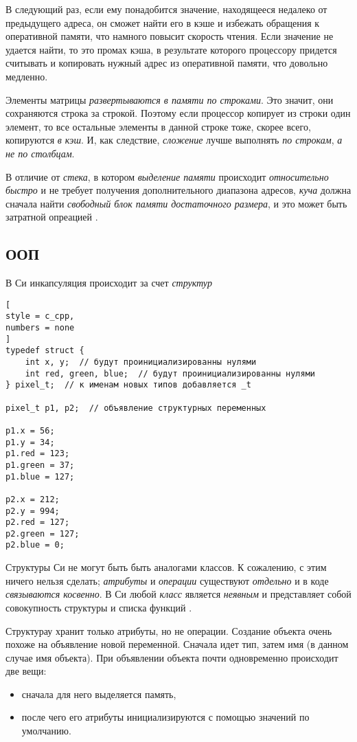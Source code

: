 \documentclass[%
	11pt,
	a4paper,
	utf8,
		]{article}
\begin{document}
В следующий раз, если ему понадобится значение, находящееся недалеко от предыдущего адреса, он сможет найти его в кэше и избежать обращения к оперативной памяти, что намного повысит скорость чтения. Если значение не удается найти, то это промах кэша, в результате которого процессору придется считывать и копировать нужный адрес из оперативной памяти, что довольно медленно.

Элементы матрицы \emph{развертываются в памяти по строками}. Это значит, они сохраняются строка за строкой. Поэтому если процессор копирует из строки один элемент, то все остальные элементы в данной строке тоже, скорее всего, копируются \emph{в кэш}. И, как следствие, \emph{сложение} лучше выполнять \emph{по строкам}, \emph{а не по столбцам}.

В отличие от \emph{стека}, в котором \emph{выделение памяти} происходит \emph{относительно быстро} и не требует получения дополнительного диапазона адресов, \emph{куча} должна сначала найти \emph{свободный блок памяти достаточного размера}, и это может быть затратной опреацией \cite[]{amini-extreme-c:2022}.

\subsection{ООП}

В Си инкапсуляция происходит за счет \emph{структур} \cite[]{amini-extreme-c:2022}
\begin{lstlisting}[
style = c_cpp,
numbers = none
]
typedef struct {
    int x, y;  // будут проинициализированны нулями
    int red, green, blue;  // будут проинициализированны нулями
} pixel_t;  // к именам новых типов добавляется _t

pixel_t p1, p2;  // объявление структурных переменных

p1.x = 56;
p1.y = 34;
p1.red = 123;
p1.green = 37;
p1.blue = 127;

p2.x = 212;
p2.y = 994;
p2.red = 127;
p2.green = 127;
p2.blue = 0;
\end{lstlisting}

{\color{red}Структуры Си не могут быть быть аналогами классов}. К сожалению, с этим ничего нельзя сделать; \emph{атрибуты} и \emph{операции} существуют \emph{отдельно} и в коде \emph{связываются косвенно}. В Си любой \emph{класс} является \emph{неявным} и представляет собой совокупность структуры и списка функций \cite[]{amini-extreme-c:2022}.

Структурау хранит только атрибуты, но не операции. Создание объекта очень похоже на объявление новой переменной. Сначала идет тип, затем имя (в данном случае имя объекта). При объявлении объекта почти одновременно происходит две вещи:
\begin{itemize}
	\item сначала для него выделяется память,
	
	\item после чего его атрибуты инициализируются с помощью значений по умолчанию.
\end{itemize}
\end{document}
